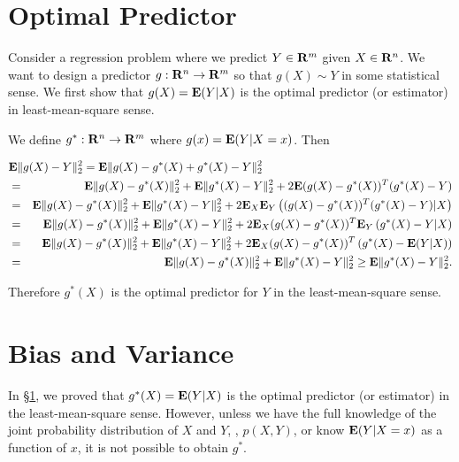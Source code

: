 \newcommand{\dataset}{\ensuremath{{\mathcal{D}}}}

\section{Optimal Predictor}
\label{sec:opt-predictor}

Consider a regression problem where we predict $Y\in\mathbf{R}^m$ given $X\in\mathbf{R}^n$.
We want to design a predictor $g:\mathbf{R}^n\to\mathbf{R}^m$
so that $g(X) \sim Y$ in some statistical sense.
We first show that $g(X) = {\bf E{}} (Y|X)$ is the optimal predictor (or estimator)
in least-mean-square sense.

We define $g^\ast: \mathbf{R}^n \to \mathbf{R}^m$ where $g(x) = {\bf E{}}(Y|X=x)$. Then

\begin{eqnarray*}
\lefteqn{
\Expect \|g(X) - Y \|_2^2
= \Expect \|g(X) - g^\ast(X) + g^\ast(X) - Y \|_2^2
}
\\
&=&
	\Expect \|g(X) - g^\ast(X)\|_2^2
	+ \Expect \|g^\ast(X) - Y \|_2^2
	+ 2\Expect (g(X) - g^\ast(X))^T (g^\ast(X) - Y)
\\
&=&
	\Expect \|g(X) - g^\ast(X)\|_2^2
	+ \Expect \|g^\ast(X) - Y \|_2^2
	+ 2\Expect_X \Expect_Y \left( (g(X) - g^\ast(X))^T (g^\ast(X) - Y) |X \right)
\\
&=&
	\Expect \|g(X) - g^\ast(X)\|_2^2
	+ \Expect \|g^\ast(X) - Y \|_2^2
	+ 2\Expect_X (g(X) - g^\ast(X))^T \Expect_Y \left( g^\ast(X) - Y |X \right)
\\
&=&
	\Expect \|g(X) - g^\ast(X)\|_2^2
	+ \Expect \|g^\ast(X) - Y \|_2^2
	+ 2\Expect_X (g(X) - g^\ast(X))^T \left( g^\ast(X) - \Expect (Y|X) \right)
\\
&=&
	\Expect \|g(X) - g^\ast(X)\|_2^2
	+ \Expect \|g^\ast(X) - Y \|_2^2
	\geq \Expect \|g^\ast(X) - Y \|_2^2.
\end{eqnarray*}

Therefore $g^\ast(X)$ is the optimal predictor for $Y$ in the least-mean-square sense.


\section{Bias and Variance}

In \S\ref{sec:opt-predictor},
we proved that $g^\ast(X) = {\bf E{}}(Y|X)$ is the optimal predictor (or estimator)
in the least-mean-square sense.
However, unless we have the full knowledge of the joint probability distribution of $X$ and $Y$,
\ie, $p(X,Y)$,
or know ${\bf E{}}(Y|X=x)$ as a function of $x$,
it is not possible to obtain $g^\ast$.

